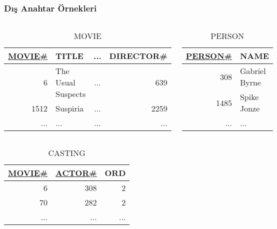 \documentclass[dvipsnames]{beamer}
\theoremstyle{plain}
\begin{document}
\begin{frame}
  \frametitle{Dış Anahtar Örnekleri}

  \begin{columns}
    \begin{tiny}
    \begin{table}
      \caption{MOVIE}
      \begin{tabular}{|r|l|c|r|}\hline
\underline{MOVIE\#} & TITLE     & ... & DIRECTOR\#\\[2pt]\hline\hline
         6 & The Usual Suspects & ... &        639\\\hline
      1512 & Suspiria           & ... &       2259\\\hline
       ... & ...                & ... &        ...\\\hline
      \end{tabular}
    \end{table}
    \end{tiny}

    \begin{tiny}
    \begin{table}
      \caption{PERSON}
      \begin{tabular}{|r|l|}\hline
\underline{PERSON\#} & NAME\\[2pt]\hline\hline
        308 & Gabriel Byrne\\\hline
       1485 & Spike Jonze  \\\hline
        ... & ...          \\\hline
      \end{tabular}
    \end{table}
    \end{tiny}
  \end{columns}

  \begin{tiny}
  \begin{table}
    \caption{CASTING}
    \begin{tabular}{|r|r|r|}\hline
\underline{MOVIE\#} & \underline{ACTOR\#} & ORD\\[2pt]\hline\hline
                  6 &                 308 &   2\\\hline
                 70 &                 282 &   2\\\hline
                ... &                 ... & ...\\\hline
    \end{tabular}
  \end{table}
  \end{tiny}


\end{frame}
\end{document}
